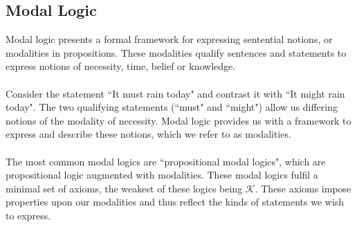 \documentclass[12pt, a4paper, titlepage]{scrartcl}
\begin{document}
\subsection{Modal Logic}\label{epistemic_modal}
Modal logic presents a formal framework for expressing sentential notions, or
modalities in propositions.
These modalities qualify sentences and statements to express notions of
necessity, time, belief or knowledge.\citep{blackburn2002modal}\\
\\
Consider the statement ``It must rain today" and contrast it with ``It
might rain today".
The two qualifying statements (``must" and ``might") allow us differing notions
of the modality of necessity.
Modal logic provides us with a framework to express and describe these
notions, which we refer to as modalities.\\
\\
The most common modal logics are ``propositional modal logics", which are
propositional logic augmented with modalities.
These modal logics fulfil a minimal set of axioms, the weakest of these logics
being $\mathcal{K}$.
These axioms impose properties upon our modalities and thus reflect the kinds of
statements we wish to express.
\end{document}
